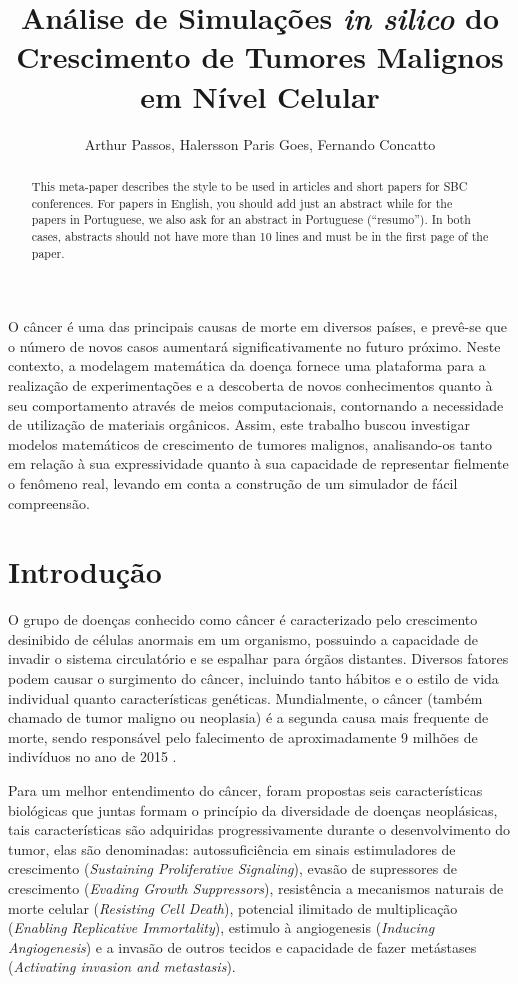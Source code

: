 \documentclass[12pt]{article}
\title{Análise de Simulações \textit{in silico} do Crescimento de Tumores Malignos em Nível Celular}
\author{Arthur Passos\inst{1}, Halersson Paris Goes\inst{1}, Fernando Concatto\inst{1}}
\begin{document}
\maketitle

\begin{abstract}
  This meta-paper describes the style to be used in articles and short papers
  for SBC conferences. For papers in English, you should add just an abstract
  while for the papers in Portuguese, we also ask for an abstract in
  Portuguese (``resumo''). In both cases, abstracts should not have more than
  10 lines and must be in the first page of the paper.
\end{abstract}

\begin{resumo}
  O câncer é uma das principais causas de morte em diversos países, e prevê-se que o número de novos casos aumentará significativamente no futuro próximo. Neste contexto, a modelagem matemática da doença fornece uma plataforma para a realização de experimentações e a descoberta de novos conhecimentos quanto à seu comportamento através de meios computacionais, contornando a necessidade de utilização de materiais orgânicos. Assim, este trabalho buscou investigar modelos matemáticos de crescimento de tumores malignos, analisando-os tanto em relação à sua expressividade quanto à sua capacidade de representar fielmente o fenômeno real, levando em conta a construção de um simulador de fácil compreensão. %
\end{resumo}

\section{Introdução}

O grupo de doenças conhecido como câncer é caracterizado pelo crescimento desinibido de células anormais em um organismo, possuindo a capacidade de invadir o sistema circulatório e se espalhar para órgãos distantes. Diversos fatores podem causar o surgimento do câncer, incluindo tanto hábitos e o estilo de vida individual quanto características genéticas. Mundialmente, o câncer (também chamado de tumor maligno ou neoplasia) é a segunda causa mais frequente de morte, sendo responsável pelo falecimento de aproximadamente 9 milhões de indivíduos no ano de 2015 \cite{WHO2017,ACS2017}.

Para um melhor entendimento do câncer, foram propostas seis características biológicas que juntas formam o princípio da diversidade de doenças neoplásicas, tais características são adquiridas progressivamente durante o desenvolvimento do tumor, elas são denominadas: autossuficiência em sinais estimuladores de crescimento (\textit{Sustaining Proliferative Signaling}), evasão de supressores de crescimento (\textit{Evading Growth Suppressors}), resistência a mecanismos naturais de morte celular (\textit{Resisting Cell Death}), potencial ilimitado de multiplicação (\textit{Enabling Replicative Immortality}), estimulo à angiogenesis (\textit{Inducing Angiogenesis}) e a invasão de outros tecidos e capacidade de fazer metástases (\textit{Activating invasion and metastasis}).
\end{document}
